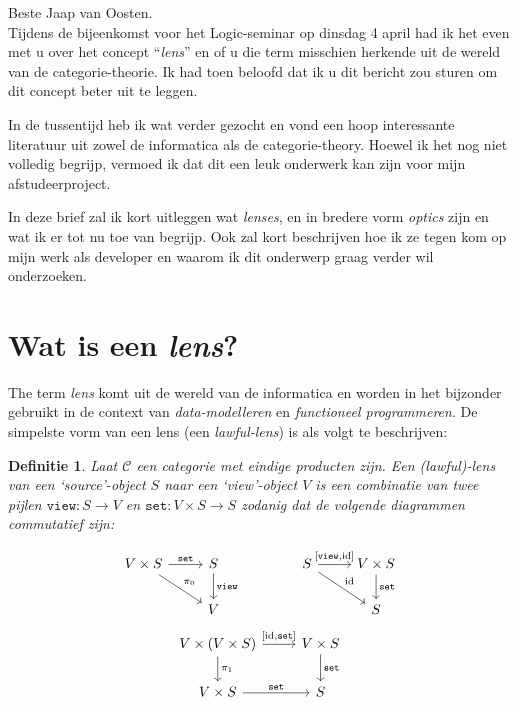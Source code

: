 \documentclass{article}
\newcommand{\id}[0]{\mathrm{id}}
\newtheorem{definition}{Definitie}
\begin{document}
\noindent Beste Jaap van Oosten. \\

Tijdens de bijeenkomst voor het Logic-seminar op dinsdag 4 april had ik het even met u over het concept ``\emph{lens}'' en of u die term misschien herkende uit de wereld van de categorie-theorie. Ik had toen beloofd dat ik u dit bericht zou sturen om dit concept beter uit te leggen. 

In de tussentijd heb ik wat verder gezocht en vond een hoop interessante literatuur uit zowel de informatica als de categorie-theory. Hoewel ik het nog niet volledig begrijp, vermoed ik dat dit een leuk onderwerk kan zijn voor mijn afstudeerproject.

In deze brief zal ik kort uitleggen wat \emph{lenses}, en in bredere vorm \emph{optics} zijn en wat ik er tot nu toe van begrijp. Ook zal kort beschrijven hoe ik ze tegen kom op mijn werk als developer en waarom ik dit onderwerp graag verder wil onderzoeken.

\section*{Wat is een \emph{lens}?}

The term \emph{lens} komt uit de wereld van de informatica en worden in het bijzonder gebruikt in de context van \emph{data-modelleren} en \emph{functioneel programmeren}. De simpelste vorm van een lens (een \emph{lawful-lens}) is als volgt te beschrijven:
\begin{definition}
	Laat $\mathcal{C}$ een categorie met eindige producten zijn. Een (lawful)-\emph{lens} van een `source'-object $S$ naar een `view'-object $V$ is een combinatie van twee pijlen $\mathtt{view}: S \to V$ en $\mathtt{set}: V \times S \to S$ zodanig dat de volgende diagrammen commutatief zijn:
    
    \[
	\begin{tikzcd}[]
		V \times S \arrow{r}[]{\mathtt{set}} \arrow{rd}[]{\pi_0} & S \arrow{d}{\mathtt{view}} \\
		& V
	\end{tikzcd} \hspace{40pt}
	\begin{tikzcd}[]
		S \arrow{r}[]{[\mathtt{view}, \id]} \arrow{rd}[]{\id} & V \times S \arrow{d}{\mathtt{set}} \\
		& S
	\end{tikzcd}
	\]
	\[
	\begin{tikzcd}[]
		V \times (V \times S) \arrow{r}[]{[\id, \mathtt{set}]} \arrow{d}{\pi_1} & V \times S \arrow{d}[]{\mathtt{set}} \\
		V \times S \arrow{r}[]{\mathtt{set}} & S
	\end{tikzcd}
	\]
\end{definition}
\end{document}
